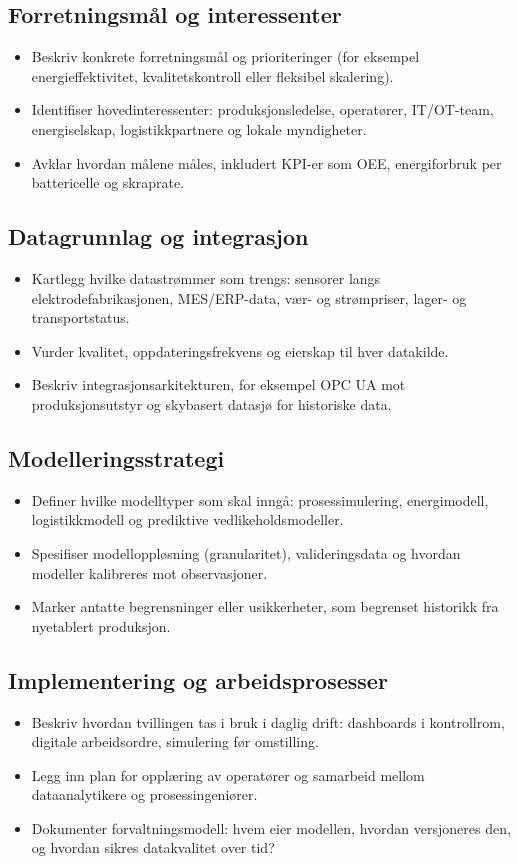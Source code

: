 \subsection{Forretningsmål og interessenter}
\begin{itemize}
    \item Beskriv konkrete forretningsmål og prioriteringer (for eksempel energieffektivitet, kvalitetskontroll eller fleksibel skalering).
    \item Identifiser hovedinteressenter: produksjonsledelse, operatører, IT/OT-team, energiselskap, logistikkpartnere og lokale myndigheter.
    \item Avklar hvordan målene måles, inkludert KPI-er som OEE, energiforbruk per battericelle og skraprate.
\end{itemize}

\subsection{Datagrunnlag og integrasjon}
\begin{itemize}
    \item Kartlegg hvilke datastrømmer som trengs: sensorer langs elektrodefabrikasjonen, MES/ERP-data, vær- og strømpriser, lager- og transportstatus.
    \item Vurder kvalitet, oppdateringsfrekvens og eierskap til hver datakilde.
    \item Beskriv integrasjonsarkitekturen, for eksempel OPC UA mot produksjonsutstyr og skybasert datasjø for historiske data.
\end{itemize}

\subsection{Modelleringsstrategi}
\begin{itemize}
    \item Definer hvilke modelltyper som skal inngå: prosessimulering, energimodell, logistikkmodell og prediktive vedlikeholdsmodeller.
    \item Spesifiser modelloppløsning (granularitet), valideringsdata og hvordan modeller kalibreres mot observasjoner.
    \item Marker antatte begrensninger eller usikkerheter, som begrenset historikk fra nyetablert produksjon.
\end{itemize}

\subsection{Implementering og arbeidsprosesser}
\begin{itemize}
    \item Beskriv hvordan tvillingen tas i bruk i daglig drift: dashboards i kontrollrom, digitale arbeidsordre, simulering før omstilling.
    \item Legg inn plan for opplæring av operatører og samarbeid mellom dataanalytikere og prosessingeniører.
    \item Dokumenter forvaltningsmodell: hvem eier modellen, hvordan versjoneres den, og hvordan sikres datakvalitet over tid?
\end{itemize}

